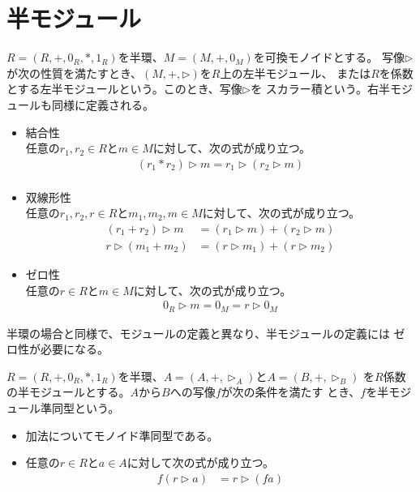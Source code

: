 \section{半モジュール}\label{s1:半モジュール} %
	\begin{definition}[半モジュール]\label{def:半モジュール} %
		$R=(R,+,0_R,*,1_R)$を半環、$M=(M,+,0_M)$を可換モノイドとする。
		写像$\rhd$が次の性質を満たすとき、$(M,+,\rhd)$を$R$上の左半モジュール、
		または$R$を係数とする左半モジュールという。このとき、写像$\rhd$を
		スカラー積という。右半モジュールも同様に定義される。
		\begin{itemize}
			\item 結合性 \\
			任意の$r_1,r_2\in R$と$m\in M$に対して、次の式が成り立つ。
			\begin{equation}\begin{split} %
				(r_1*r_2)\rhd m = r_1\rhd (r_2\rhd m) \\
			\end{split}\end{equation} %
			\item 双線形性 \\
			任意の$r_1,r_2,r\in R$と$m_1,m_2,m\in M$に対して、次の式が成り立つ。
			\begin{equation}\begin{split} %
				(r_1+r_2)\rhd m &= (r_1\rhd m)+(r_2\rhd m) \\
				r\rhd (m_1+m_2) &= (r\rhd m_1)+(r\rhd m_2)
			\end{split}\end{equation} %
			\item ゼロ性 \\
			任意の$r\in R$と$m\in M$に対して、次の式が成り立つ。
			\begin{equation}\begin{split} %
				0_R\rhd m = 0_M = r\rhd 0_M
			\end{split}\end{equation} %
		\end{itemize}
	\end{definition} %

	半環の場合と同様で、モジュールの定義と異なり、半モジュールの定義には
	ゼロ性が必要になる。

	\begin{definition}[半モジュール準同型]\label{def:半モジュール準同型} %
		$R=(R,+,0_R,*,1_R)$を半環、$A=(A,+,\rhd_A)$と$A=(B,+,\rhd_B)$
		を$R$係数の半モジュールとする。$A$から$B$への写像$f$が次の条件を満たす
		とき、$f$を半モジュール準同型という。
		\begin{itemize}
			\item 加法についてモノイド準同型である。
			\item 任意の$r\in R$と$a\in A$に対して次の式が成り立つ。
			\begin{equation*}\begin{split} %
				f(r\rhd a) &= r\rhd (fa)
			\end{split}\end{equation*} %
		\end{itemize}
	\end{definition} %

